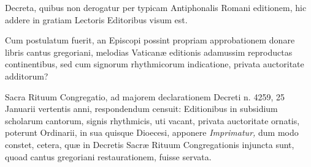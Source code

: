 \documentclass[vesperale_romanum.tex]{subfiles}
\begin{document}
\begin{titlepage}
 \begin{center}
\fontsize{40}{50}\selectfont{}


{\LARGE{}}
 \end{center}
 \begin{center}
{\LARGE{}}
 \end{center}
 
 
 \vfill
 
{}
 {\centering{\capspace{\YEAR}\par}}
\end{titlepage}



\thispagestyle{empty}
Decreta, quibus non derogatur per typicam Antiphonalis Romani editionem, hic addere in gratiam Le\-ctoris Editoribus visum est.

\myrule

{\centering{}\par} %

{}

Cum postulatum fuerit, an Episcopi possint propriam approbationem donare libris cantus gregoriani, melodias Vaticanæ editionis adamussim reprodu\-ctas continentibus, sed cum signorum rhythmicorum indicatione, privata au\-ctoritate additorum?

Sacra Rituum Congregatio, ad majorem declarationem Decreti n. 4259, 25 Januarii vertentis anni, respondendum censuit:
Editionibus in subsidium scholarum cantorum, signis rhythmicis, uti vacant, privata au\-ctoritate ornatis, poterunt Ordinarii, in sua quisque Dioecesi, apponere \textit{Imprimatur,} dum modo constet, cetera, quæ in Decretis Sacræ Rituum Congregationis injun\-cta sunt, quoad cantus gregoriani restaurationem, fuisse servata.
\end{document}
